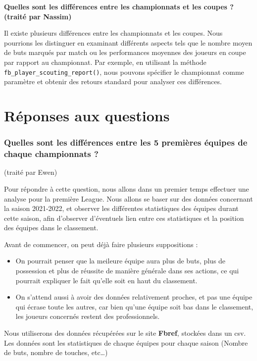 \documentclass[
]{article}
\begin{document}
\textbf{Quelles sont les différences entre les championnats et les
coupes ? (traité par Nassim)}

Il existe plusieurs différences entre les championnats et les coupes.
Nous pourrions les distinguer en examinant différents aspects tels que
le nombre moyen de buts marqués par match ou les performances moyennes
des joueurs en coupe par rapport au championnat. Par exemple, en
utilisant la méthode \texttt{fb\_player\_scouting\_report()}, nous
pouvons spécifier le championnat comme paramètre et obtenir des retours
standard pour analyser ces différences.

\section{Réponses aux questions}\label{ruxe9ponses-aux-questions}

\subsubsection{Quelles sont les différences entre les 5 premières
équipes de chaque championnats
?}\label{quelles-sont-les-diffuxe9rences-entre-les-5-premiuxe8res-uxe9quipes-de-chaque-championnats}

(traité par Ewen)

Pour répondre à cette question, nous allons dans un premier temps
effectuer une analyse pour la première League. Nous allons se baser sur
des données concernant la saison 2021-2022, et observer les différentes
statistiques des équipes durant cette saison, afin d'observer
d'éventuels lien entre ces statistiques et la position des équipes dans
le classement.

Avant de commencer, on peut déjà faire plusieurs suppositions :

\begin{itemize}
\item
  On pourrait penser que la meileure équipe aura plus de buts, plus de
  possession et plus de réussite de manière générale dans ses actions,
  ce qui pourrait expliquer le fait qu'elle soit en haut du classement.
\item
  On s'attend aussi à avoir des données relativement proches, et pas une
  équipe qui écrase toute les autres, car bien qu'une équipe soit bas
  dans le classement, les joueurs concernés restent des professionnels.
\end{itemize}

Nous utiliserons des données récupérées sur le site \textbf{Fbref},
stockées dans un csv. Les données sont les statistiques de chaque
équipes pour chaque saison (Nombre de buts, nombre de touches,
etc\ldots)
\end{document}
